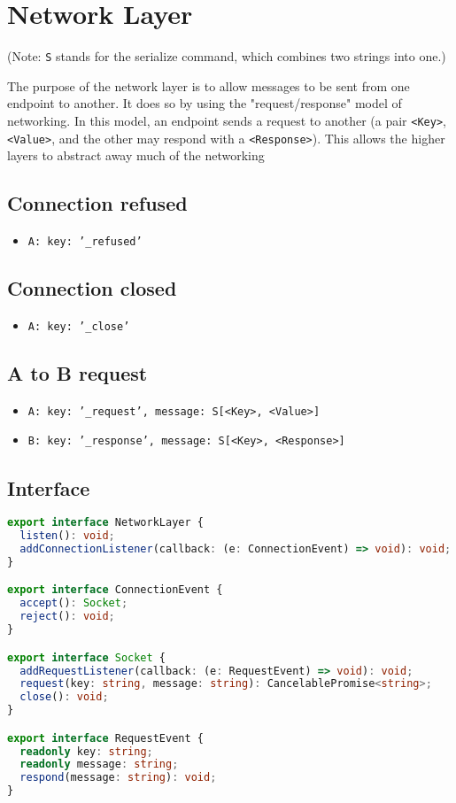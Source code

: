 \documentclass{article}
\begin{document}
\section{Network Layer}
(Note: \texttt{S} stands for the serialize command, which combines two strings into one.)

The purpose of the network layer is to allow messages to be sent from one endpoint to another. It does so by using the "request/response" model of networking. In this model, an endpoint sends a request to another (a pair \texttt{<Key>}, \texttt{<Value>}, and the other may respond with a \texttt{<Response>}). This allows the higher layers to abstract away much of the networking

\subsection*{Connection refused}
\begin{itemize}
    \item \texttt{A: key: '\_refused'}
\end{itemize}


\subsection*{Connection closed}
\begin{itemize}
    \item \texttt{A: key: '\_close'}
\end{itemize}

\subsection*{A to B request}
\begin{itemize}
    \item \texttt{A: key: '\_request', message: S[<Key>, <Value>]}
    \item \texttt{B: key: '\_response', message: S[<Key>, <Response>]}
\end{itemize}

\subsection*{Interface}
\begin{lstlisting}[language=Typescript]
export interface NetworkLayer {
  listen(): void;
  addConnectionListener(callback: (e: ConnectionEvent) => void): void;
}

export interface ConnectionEvent {
  accept(): Socket;
  reject(): void;
}

export interface Socket {
  addRequestListener(callback: (e: RequestEvent) => void): void;
  request(key: string, message: string): CancelablePromise<string>;
  close(): void;
}

export interface RequestEvent {
  readonly key: string;
  readonly message: string;
  respond(message: string): void;
}
\end{lstlisting}
\end{document}
